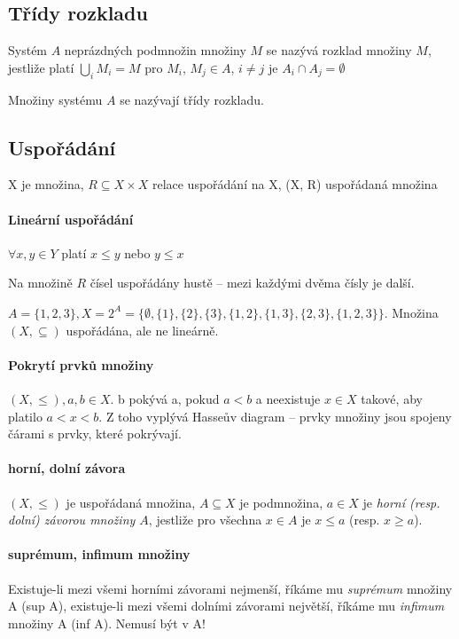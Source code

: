 \documentclass[a4paper, 11pt]{report}
\begin{document}
\subsection{Třídy rozkladu}

Systém $A$ neprázdných podmnožin množiny $M$ se nazývá rozklad množiny $M$, jestliže platí $\bigcup_i M_i = M$ pro $M_i$, $M_j \in A$, $i \neq j$ je $A_i \cap A_j = \emptyset$

Množiny systému $A$ se nazývají třídy rozkladu.

\subsection{Uspořádání}

X je množina, $R \subseteq X \times X$ relace uspořádání na X, (X, R) uspořádaná množina

\paragraph{Lineární uspořádání}

$\forall x,y \in Y$ platí $x \leq y$ nebo $y \leq x$

Na množině $R$ čísel uspořádány hustě -- mezi každými dvěma čísly je další.

$A = \{1,2,3\}, X = 2^A = \{\emptyset, \{1\}, \{2\}, \{3\}, \{1, 2\}, \{1, 3\}, \{2, 3\}, \{1, 2, 3\} \}$. Množina $(X, \subseteq)$ uspořádána, ale ne lineárně.

\paragraph{Pokrytí prvků množiny}
$(X, \leq), a,b \in X$. b pokývá a, pokud $a < b$ a neexistuje $x \in X$ takové, aby platilo $a < x < b$. Z toho vyplývá Hasseův diagram -- prvky množiny jsou spojeny čárami s prvky, které pokrývají.

\paragraph{horní, dolní závora}
$(X, \leq)$ je uspořádaná množina, $A \subseteq X$ je podmnožina, $a \in X$ je \emph{horní (resp. dolní) závorou množiny $A$}, jestliže pro všechna $x \in A$ je $x \leq a$ (resp. $x \geq a$).

\paragraph{suprémum, infimum množiny}
Existuje-li mezi všemi horními závorami nejmenší, říkáme mu \emph{suprémum} množiny A (sup A), existuje-li mezi všemi dolními závorami největší, říkáme mu \emph{infimum} množiny A (inf A). Nemusí být v A!
\end{document}
